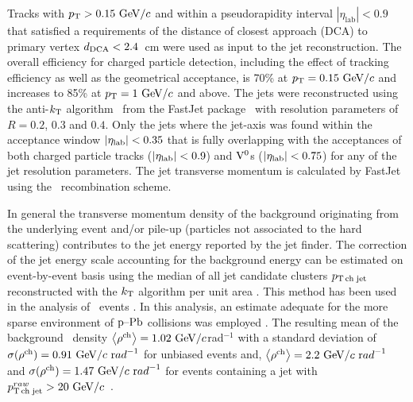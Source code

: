 Tracks with $p_{\mathrm{T}} > 0.15 \mathrm{~GeV}/c$ and within a pseudorapidity interval $|\eta_\mathrm{lab}|<0.9$ that satisfied a requirements of the distance of closest approach (DCA) to primary vertex $d_{\rm DCA} < 2.4$~cm were used as input to the jet reconstruction.
The overall efficiency for charged particle detection, including the effect of tracking efficiency as well as the geometrical acceptance, is 70\% at $p_{\mathrm{T}} = 0.15 \mbox{~GeV}/c$ and increases to 85\% at $p_{\mathrm{T}} = 1 \mbox{~GeV}/c$ and above. 
The jets were reconstructed using the anti-$k_{\rm T}$ algorithm~\cite{Cacciari:2008gp} from the FastJet package~\cite{Cacciari:2011ma,Cacciari:2005hq} with resolution parameters of $R=0.2$, $0.3$ and $0.4$. 
Only the jets where the jet-axis was found within the acceptance window $\left|\eta_{\rm lab}\right|<0.35$ that is fully overlapping with the acceptances of both charged particle tracks ($\left|\eta_{\rm lab}\right|<0.9$) and ${\rm V}^{0}$s ($\left|\eta_{\rm lab}\right|<0.75$) for any of the jet resolution parameters.
The jet transverse momentum is calculated by FastJet using the \pt\ recombination scheme. 

In general the transverse momentum density of the background originating from the underlying event and/or pile-up (particles not associated to the hard scattering) contributes to the jet energy reported by the jet finder. 
The correction of the jet energy scale accounting for the background energy can be estimated on event-by-event basis using the median of all jet candidate clusters $p_\mathrm{T\,ch\;jet}$ reconstructed with the $k_{\textnormal{T}}$ algorithm per unit area \cite{Cacciari:2008gn}. 
This method has been used in the analysis of \PbPb\ events \cite{Abelev:2013kqa,Adam:2015ewa}.
In this analysis, an estimate adequate for the more sparse environment of $\mbox{p--Pb}$ collisions was employed \cite{Adam:2015hoa}. The resulting mean of the background \pt\ density $\left\langle\rho^{\rm ch}\right\rangle=1.02~\mathrm{GeV}/c $rad$^{-1}$ with a standard deviation of $\sigma(\rho^{\rm ch})=0.91~\mathrm{GeV}/c~{\mathrm rad}^{-1}$ for unbiased events and, $\left\langle\rho^{\rm ch}\right\rangle=2.2~\mathrm{GeV}/c~{\mathrm rad}^{-1}$ and $\sigma(\rho^{\rm ch})=1.47~\mathrm{GeV}/c~{\mathrm rad}^{-1}$ for events containing a jet with $p_\mathrm{T\,ch\;jet}^{raw}>20~\mathrm{GeV}/c$~\cite{Adam:2015hoa}.



